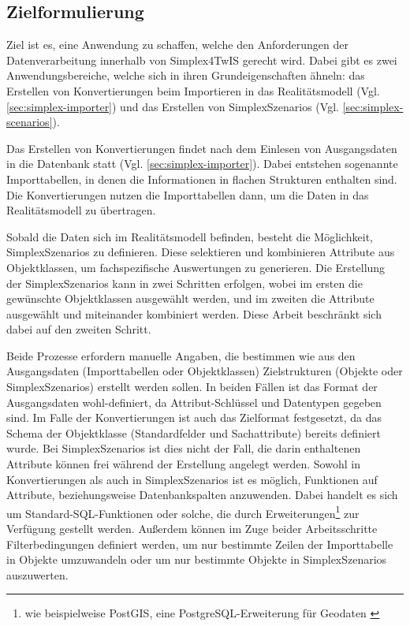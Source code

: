 \subsection{Zielformulierung}

Ziel ist es, eine Anwendung zu schaffen, welche den Anforderungen der Datenverarbeitung innerhalb von Simplex4TwIS gerecht wird. Dabei gibt es zwei Anwendungsbereiche, welche sich in ihren Grundeigenschaften ähneln: das Erstellen von Konvertierungen beim Importieren in das Realitätsmodell (Vgl. \ref{sec:simplex-importer}) und das Erstellen von SimplexSzenarios (Vgl. \ref{sec:simplex-scenarios}).

Das Erstellen von Konvertierungen findet nach dem Einlesen von Ausgangsdaten in die Datenbank statt (Vgl. \ref{sec:simplex-importer}). Dabei entstehen sogenannte Importtabellen, in denen die Informationen in flachen Strukturen enthalten sind. Die Konvertierungen nutzen die Importtabellen dann, um die Daten in das Realitätsmodell zu übertragen.

Sobald die Daten sich im Realitätsmodell befinden, besteht die Möglichkeit, SimplexSzenarios zu definieren. Diese selektieren und kombinieren Attribute aus Objektklassen, um fachspezifische Auswertungen zu generieren. Die Erstellung der SimplexSzenarios kann in zwei Schritten erfolgen, wobei im ersten die gewünschte Objektklassen ausgewählt werden, und im zweiten die Attribute ausgewählt und miteinander kombiniert werden. Diese Arbeit beschränkt sich dabei auf den zweiten Schritt.

Beide Prozesse erfordern manuelle Angaben, die bestimmen wie aus den Ausgangsdaten (Importtabellen oder Objektklassen) Zielstrukturen (Objekte oder SimplexSzenarios) erstellt werden sollen. In beiden Fällen ist das Format der Ausgangsdaten wohl-definiert, da Attribut-Schlüssel und Datentypen gegeben sind. Im Falle der Konvertierungen ist auch das Zielformat festgesetzt, da das Schema der Objektklasse (Standardfelder und Sachattribute) bereits definiert wurde. Bei SimplexSzenarios ist dies nicht der Fall, die darin enthaltenen Attribute können frei während der Erstellung angelegt werden. Sowohl in Konvertierungen als auch in SimplexSzenarios ist es möglich, Funktionen auf Attribute, beziehungsweise Datenbankspalten anzuwenden. Dabei handelt es sich um Standard-\ac{SQL}-Funktionen oder solche, die durch Erweiterungen\footnote{wie beispielweise PostGIS, eine PostgreSQL-Erweiterung für Geodaten \parencite{postgispscPostGIS}} zur Verfügung gestellt werden. Außerdem können im Zuge beider Arbeitsschritte Filterbedingungen definiert werden, um nur bestimmte Zeilen der Importtabelle in Objekte umzuwandeln oder um nur bestimmte Objekte in SimplexSzenarios auszuwerten.


